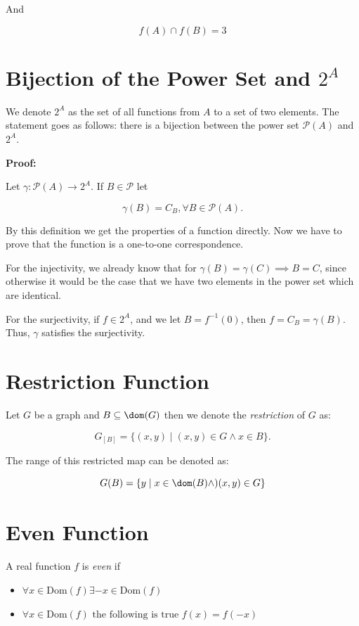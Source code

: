 And 

\[
	f(A) \cap f(B) = 3
\]

\section{Bijection of the Power Set and \texorpdfstring{\(2^A\)}{}}

We denote \(2^A\) as the set of all functions from \(A\) to a set of two elements.
The statement goes as follows: there is a bijection between the power set \(\mathcal{P}(A)\) and 
\(2^A\).

\textbf{Proof:}

Let \(\gamma: \mathcal{P}(A) \to 2^A\). If \(B \in \mathcal{P}\) let 

\[
	\gamma (B) = C_B, \forall B \in \mathcal{P}(A).
\]

By this definition we get the properties of a function directly. Now we have to prove that 
the function is a one-to-one correspondence.

For the injectivity, we already know that for \(\gamma(B) = \gamma(C) \implies B = C\), since otherwise it would be the case 
that we have two elements in the power set which are identical.

For the surjectivity, if \(f \in 2^A\), and we let \(B = f^{-1}(0)\), then \(f = C_B = \gamma(B)\). Thus, 
\(\gamma\) satisfies the surjectivity.

\QED

\section{Restriction Function}

Let \(G\) be a graph and \(B \subseteq \dom(G)\) then we denote the \emph{restriction} of \(G\) as:

\[
	G_{[B]} = \{(x, y) \mid (x, y) \in G \land x \in B\}.
\]

The range of this restricted map can be denoted as:

\[
	G(B) = \{y \mid x \in \dom(B) \land )(x, y) \in G\}
\]

\section{Even Function}

A real function \(f\) is \emph{even} if

\begin{itemize}
	
	\item \(\forall x \in \text{Dom}(f) \exists -x \in \text{Dom}(f)\)
	
	\item \(\forall x \in \text{Dom}(f) \text{ the following is true } f(x) = f(-x)\)

\end{itemize}

